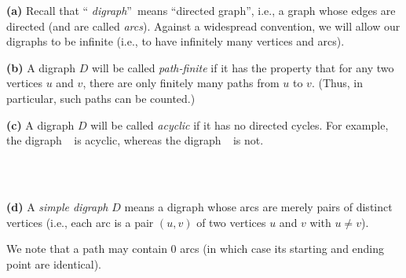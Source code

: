 \begin{convention}
\label{conv.lgv.digraph}\textbf{(a)} Recall that \textquotedblleft%
\emph{digraph}\textquotedblright\ means \textquotedblleft directed
graph\textquotedblright, i.e., a graph whose edges are directed (and are
called \emph{arcs}). Against a widespread convention, we will allow our
digraphs to be infinite (i.e., to have infinitely many vertices and arcs).
\medskip

\textbf{(b)} A digraph $D$ will be called \emph{path-finite} if it has the
property that for any two vertices $u$ and $v$, there are only finitely many
paths from $u$ to $v$. (Thus, in particular, such paths can be counted.)
\medskip

\textbf{(c)} A digraph $D$ will be called \emph{acyclic} if it has no directed
cycles. For example, the digraph $%
\raisebox{-3.3pc}{
}%
$ is acyclic, whereas the digraph $%
\raisebox{-3.3pc}{
}%
$ is not. \medskip

\textbf{(d)} A \emph{simple digraph} $D$ means a digraph whose arcs are merely
pairs of distinct vertices (i.e., each arc is a pair $\left(  u,v\right)  $ of
two vertices $u$ and $v$ with $u\neq v$).
\end{convention}

We note that a path may contain $0$ arcs (in which case its starting and
ending point are identical).


